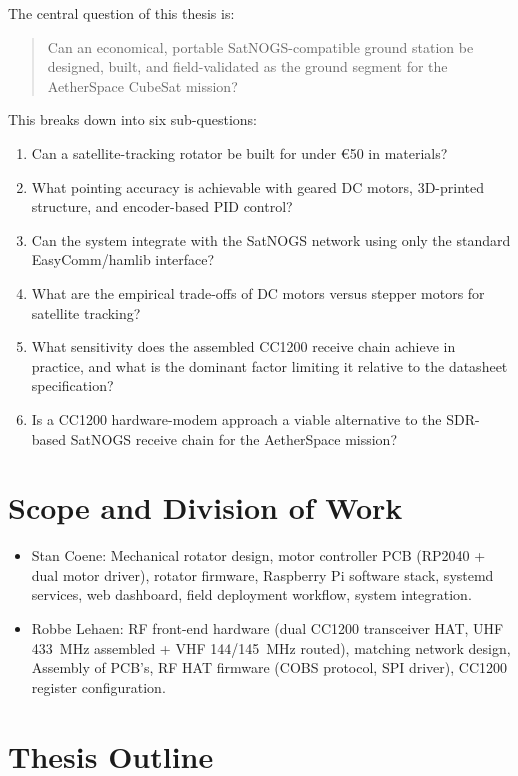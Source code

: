 The central question of this thesis is:

\begin{quote}
    Can an economical, portable SatNOGS-compatible ground station be designed, built, and field-validated as the ground segment for the AetherSpace CubeSat mission?
\end{quote}

This breaks down into six sub-questions:

\begin{enumerate}
    \item Can a satellite-tracking rotator be built for under \euro{}50 in materials?
    \item What pointing accuracy is achievable with geared DC motors, 3D-printed structure, and encoder-based PID control?
    \item Can the system integrate with the SatNOGS network using only the standard EasyComm/hamlib interface?
    \item What are the empirical trade-offs of DC motors versus stepper motors for satellite tracking?
    \item What sensitivity does the assembled CC1200 receive chain achieve in practice, and what is the dominant factor limiting it relative to the datasheet specification?
    \item Is a CC1200 hardware-modem approach a viable alternative to the SDR-based SatNOGS receive chain for the AetherSpace mission?
\end{enumerate}

\section{Scope and Division of Work}

\begin{itemize}
    \item Stan Coene: Mechanical rotator design, motor controller PCB (RP2040 + dual motor driver), rotator firmware, Raspberry Pi software stack, systemd services, web dashboard, field deployment workflow, system integration.
    \item Robbe Lehaen: RF front-end hardware (dual CC1200 transceiver HAT, UHF 433~MHz assembled + VHF 144/145~MHz routed), matching network design, Assembly of PCB's, RF HAT firmware (COBS protocol, SPI driver), CC1200 register configuration.
\end{itemize}

\newpage
\section{Thesis Outline}

